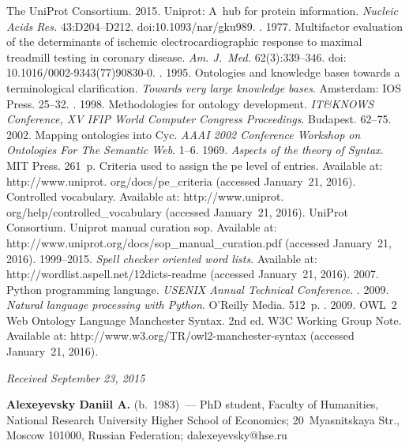 \begin{multicols}{2}
{{\begin{thebibliography}{99}
The UniProt Consortium. 2015. Uniprot: A~hub for protein information. 
\textit{Nucleic Acids Res.} 43:D204--D212. doi:10.1093/nar/gku989.
. 1977. Multifactor evaluation of the 
determinants of ischemic electrocardiographic response to maximal treadmill 
testing in coronary disease. \textit{Am. J.~Med.} 62(3):339--346. doi: 
10.1016/0002-9343(77)90830-0.
. 1995. Ontologies and knowledge bases 
towards a terminological clarification. \textit{Towards very large knowledge 
bases}. Amsterdam: IOS Press. 25--32.
. 1998. Methodologies for 
ontology development. \textit{IT\&KNOWS Conference, XV IFIP World 
Computer Congress Proceedings}. Budapest. 62--75.
 2002. Mapping ontologies into Cyc. 
\textit{AAAI 2002 Conference Workshop on Ontologies For The Semantic Web}. 
1--6.
 1969. \textit{Aspects of the theory of Syntax}.  MIT Press. 
261~p. 
Criteria used to assign the pe level of entries. Available at: {\sf 
http://www.uniprot. org/docs/pe\_criteria} (accessed January~21, 2016).
Controlled vocabulary. Available at: {\sf 
http://www.uniprot. org/help/controlled\_vocabulary} (accessed January~21, 
2016).
UniProt Consortium. Uniprot manual curation sop. Available at: {\sf 
http://www.uniprot.org/docs/sop\_manual\_\linebreak curation.pdf} (accessed January~21, 
2016).
 1999--2015. \textit{Spell checker oriented word lists}. Available 
at: {\sf http://wordlist.aspell.net/12dicts-readme} (accessed January~21, 2016).
 2007. Python programming language. \textit{USENIX 
Annual Technical Conference}.
. 2009. \textit{Natural language 
processing with Python}. O'Reilly Media. 512~p.
. 2009. OWL~2 Web Ontology 
Language Manchester Syntax. 2nd ed. W3C Working Group Note. Available at: 
{\sf http://www.w3.org/TR/owl2-manchester-syntax} (accessed January~21, 
2016).

\end{thebibliography}

 }
 }

\end{multicols}

\vspace*{-3pt}

\hfill{\small\textit{Received September 23, 2015}}

\Contrl

\noindent
  \textbf{Alexeyevsky Daniil A.} (b.\ 1983)~--- PhD student, Faculty of 
Humanities, National Research University Higher School of Economics; 
20~Myasnitskaya Str., Moscow 101000, Russian Federation; 
dalexeyevsky@hse.ru

   
\label{end\stat}


\renewcommand{\bibname}{\protect\rm Литература}